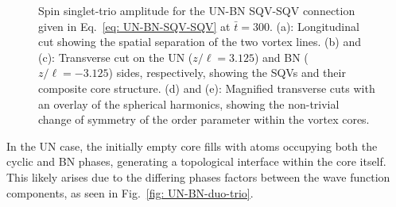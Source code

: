 \begin{figure}
    \caption{\label{fig: UN-BN-SQV-SQV-singlets}Spin singlet-trio amplitude for
        the UN-BN SQV-SQV connection given in Eq.~\eqref{eq: UN-BN-SQV-SQV} at
        \(\bar{t} = 300\).
        (a): Longitudinal cut showing the spatial separation of the two vortex
        lines.
        (b) and (c): Transverse cut on the UN (\(z/\ell = 3.125\)) and BN
        (\(z/\ell = -3.125\)) sides, respectively, showing the SQVs and their
        composite core structure.
        (d) and (e): Magnified transverse cuts with an overlay of the spherical
        harmonics, showing the non-trivial change of symmetry of the order
        parameter within the vortex cores.}
\end{figure}
In the UN case, the initially empty core fills with atoms occupying both the
cyclic and BN phases, generating a topological interface within the core itself.
This likely arises due to the differing phases factors between the wave function
components, as seen in Fig.~\ref{fig: UN-BN-duo-trio}.

